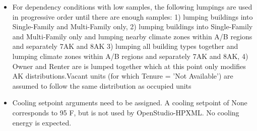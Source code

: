 \begin{itemize}
\item For dependency conditions with low samples, the following lumpings are used in progressive order until there are enough samples: 1) lumping buildings into Single-Family and Multi-Family only, 2) lumping buildings into Single-Family and Multi-Family only and lumping nearby climate zones within A/B regions and separately 7AK and 8AK 3) lumping all building types together and lumping climate zones within A/B regions and separately 7AK and 8AK, 4) Owner and Renter are is lumped together which at this point only modifies AK distributions.Vacant units (for which Tenure = 'Not Available') are assumed to follow the same distribution as occupied  units
\item Cooling setpoint arguments need to be assigned. A cooling setpoint of None corresponds to 95 F, but is not used by OpenStudio-HPXML. No cooling energy is expected.
\end{itemize}
